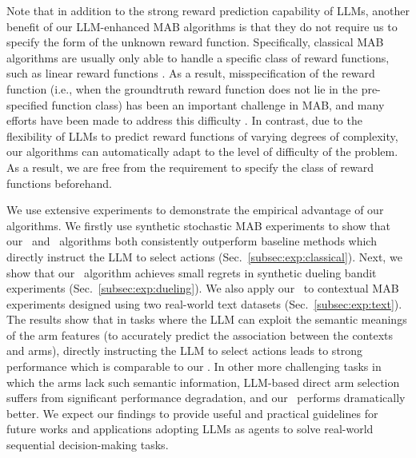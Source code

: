 Note that in addition to the strong reward prediction capability of LLMs, another benefit of our LLM-enhanced MAB algorithms is that they do not require us to specify the form of the unknown reward function.
Specifically, classical MAB algorithms are usually only able to handle a specific class of reward functions, such as linear reward functions \cite{NIPS11_abbasi2011improved}.
As a result, misspecification of the reward function (i.e., when the groundtruth reward function does not lie in the pre-specified function class) has been an important challenge in MAB, and many efforts have been made to address this difficulty \cite{ghosh2017misspecified,wang2024online}.
In contrast, due to the flexibility of LLMs to predict reward functions of varying degrees of complexity, our algorithms can automatically adapt to the level of difficulty of the problem.
As a result, we are free from the requirement to specify the class of reward functions beforehand.

We use extensive experiments to demonstrate the empirical advantage of our algorithms.
We firstly use synthetic stochastic MAB experiments to show that our \algts~and \algro~algorithms both consistently outperform baseline methods which directly instruct the LLM to select actions (Sec.~\ref{subsec:exp:classical}).
Next, we show that our \algtsduel~algorithm achieves small regrets in synthetic dueling bandit experiments (Sec.~\ref{subsec:exp:dueling}).
We also apply our \algts~to contextual MAB experiments designed using two real-world text datasets (Sec.~\ref{subsec:exp:text}).
The results show that in tasks where the LLM can exploit the semantic meanings of the arm features (to accurately predict the association between the contexts and arms), directly instructing the LLM to select actions leads to strong performance which is comparable to our \algts.
In other more challenging tasks in which the arms lack such semantic information, LLM-based direct arm selection suffers from significant performance degradation, and our \algts~performs dramatically better.
We expect our findings to provide useful and practical guidelines for future works and applications adopting LLMs as agents to solve real-world sequential decision-making tasks.
